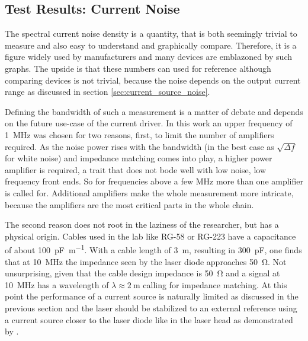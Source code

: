 \subsection{Test Results: Current Noise}%
\label{sec:results_current_noise}
The spectral current noise density is a quantity, that is both seemingly trivial to measure and also easy to understand and graphically compare. Therefore, it is a figure widely used by manufacturers and many devices are emblazoned by such graphs. The upside is that these numbers can used for reference although comparing devices is not trivial, because the noise depends on the output current range as discussed in section \ref{sec:current_source_noise}.

Defining the bandwidth of such a measurement is a matter of debate and depends on the future use-case of the current driver. In this work an upper frequency of \qty{1}{\MHz} was chosen for two reasons, first, to limit the number of amplifiers required. As the noise power rises with the bandwidth (in the best case as $\sqrt{\Delta f}$ for white noise) and impedance matching comes into play, a higher power amplifier is required, a trait that does not bode well with low noise, low frequency front ends. So for frequencies above a few \unit{\MHz} more than one amplifier is called for. Additional amplifiers make the whole measurement more intricate, because the amplifiers are the most critical parts in the whole chain.

The second reason does not root in the laziness of the researcher, but has a physical origin. Cables used in the lab like RG-58 or RG-223 have a capacitance of about \qty{100}{\pF \per \m}. With a cable length of \qty{3}{\m}, resulting in \qty{300}{\pF}, one finds that at \qty{10}{\MHz} the impedance seen by the laser diode approaches \qty{50}{\ohm}. Not unsurprising, given that the cable design impedance is \qty{50}{\ohm} and a signal at \qty{10}{\MHz} has a wavelength of $\lambda \approx \qty{2}{\m}$ calling for impedance matching. At this point the performance of a current source is naturally limited as discussed in the previous section and the laser should be stabilized to an external reference using a current source closer to the laser diode like in the laser head as demonstrated by \citeauthor{current_mod_paper} \cite{current_mod_paper}.

